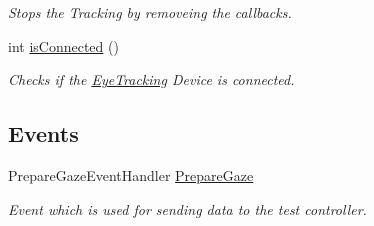\begin{DoxyCompactItemize}
\begin{DoxyCompactList}\small\item\em Stops the Tracking by removeing the callbacks. \end{DoxyCompactList}\item 
int \hyperlink{class_web_analyzer_1_1_eye_tracking_1_1_eye_tracking_model_a29a7377e721b88fbd80553699e1d7228}{is\+Connected} ()
\begin{DoxyCompactList}\small\item\em Checks if the \hyperlink{namespace_web_analyzer_1_1_eye_tracking}{Eye\+Tracking} Device is connected. \end{DoxyCompactList}\end{DoxyCompactItemize}
\subsection*{Events}
\begin{DoxyCompactItemize}
\item 
Prepare\+Gaze\+Event\+Handler \hyperlink{class_web_analyzer_1_1_eye_tracking_1_1_eye_tracking_model_a170dd57ad1784737ddf34dc14f82293d}{Prepare\+Gaze}
\begin{DoxyCompactList}\small\item\em Event which is used for sending data to the test controller. \end{DoxyCompactList}\end{DoxyCompactItemize}
